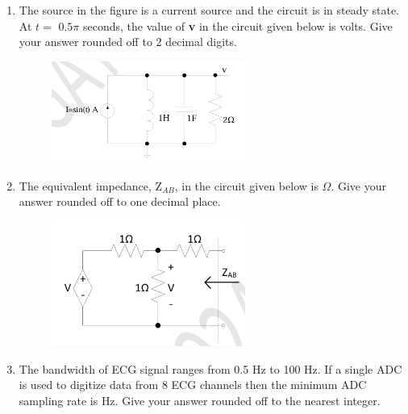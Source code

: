 \documentclass[a4paper,12pt]{exam}
\numberwithin{equation}{enumi}
\numberwithin{figure}{enumi}
\begin{document}
\begin{enumerate}
\hfill{}

\item The source in the figure is a current source and the circuit is in steady state. At $t =$  $0.5\pi$ seconds, the value of \textbf{v} in the circuit given below is \underline{\hspace{1cm}} volts. Give your answer rounded off to 2 decimal digits.


\begin{figure}[H]
\centering
\includegraphics[width=0.6\textwidth]{figs/Q56.png}
\label{fig:Q56.png}
\end{figure}

\hfill{}

\item The equivalent impedance, $\text{Z}_{AB}$, in the circuit given below is \underline{\hspace{1cm}} $\Omega$. Give your 
answer rounded off to one decimal place.


\begin{figure}[H]
\centering
\includegraphics[width=0.6\textwidth]{figs/Q57.png}
\label{fig:Q57.png}
\end{figure}

\hfill{}

\item The bandwidth of ECG signal ranges from 0.5 Hz to 100 Hz. If a single ADC is used to digitize data from 8 ECG channels then the minimum ADC sampling rate is \underline{\hspace{1cm}}  
Hz. Give your answer rounded off to the nearest integer.


\end{enumerate}
\end{document}
